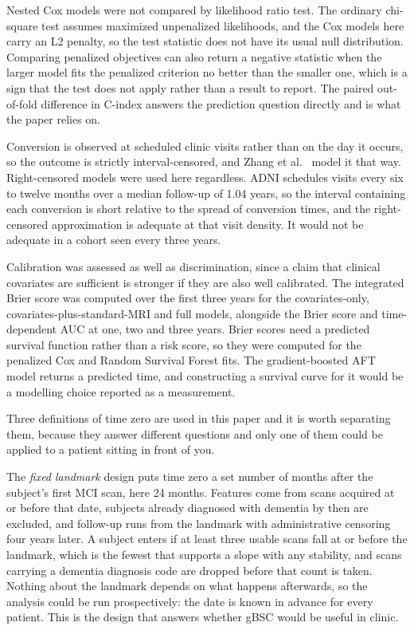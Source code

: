 \documentclass[blue]{ludusofficial}  %
\begin{document}
Nested Cox models were not compared by likelihood ratio test. The ordinary chi-square test assumes maximized unpenalized likelihoods, and the Cox models here carry an L2 penalty, so the test statistic does not have its usual null distribution. Comparing penalized objectives can also return a negative statistic when the larger model fits the penalized criterion no better than the smaller one, which is a sign that the test does not apply rather than a result to report. The paired out-of-fold difference in C-index answers the prediction question directly and is what the paper relies on.

Conversion is observed at scheduled clinic visits rather than on the day it occurs, so the outcome is strictly interval-censored, and Zhang et al.~\cite{zhang2024interval} model it that way. Right-censored models were used here regardless. ADNI schedules visits every six to twelve months over a median follow-up of 1.04 years, so the interval containing each conversion is short relative to the spread of conversion times, and the right-censored approximation is adequate at that visit density. It would not be adequate in a cohort seen every three years.

Calibration was assessed as well as discrimination, since a claim that clinical covariates are sufficient is stronger if they are also well calibrated. The integrated Brier score was computed over the first three years for the covariates-only, covariates-plus-standard-MRI and full models, alongside the Brier score and time-dependent AUC at one, two and three years. Brier scores need a predicted survival function rather than a risk score, so they were computed for the penalized Cox and Random Survival Forest fits. The gradient-boosted AFT model returns a predicted time, and constructing a survival curve for it would be a modelling choice reported as a measurement.

Three definitions of time zero are used in this paper and it is worth separating them, because they answer different questions and only one of them could be applied to a patient sitting in front of you.

The \emph{fixed landmark} design puts time zero a set number of months after the subject's first MCI scan, here 24 months. Features come from scans acquired at or before that date, subjects already diagnosed with dementia by then are excluded, and follow-up runs from the landmark with administrative censoring four years later. A subject enters if at least three usable scans fall at or before the landmark, which is the fewest that supports a slope with any stability, and scans carrying a dementia diagnosis code are dropped before that count is taken. Nothing about the landmark depends on what happens afterwards, so the analysis could be run prospectively: the date is known in advance for every patient. This is the design that answers whether gBSC would be useful in clinic.
\end{document}
